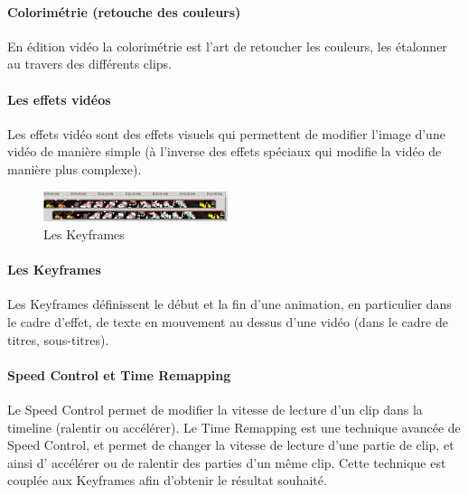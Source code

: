 \paragraph{Colorimétrie (retouche des couleurs)}

En édition vidéo la colorimétrie est l'art de retoucher les couleurs,
les étalonner au travers des différents clips.

\paragraph{Les effets vidéos}

Les effets vidéo sont des effets visuels qui permettent de modifier
l'image d'une vidéo de manière simple (à l'inverse des effets spéciaux
qui modifie la vidéo de manière plus complexe).

\begin{figure}

   \vspace{-20pt}

    \begin{center}

      \includegraphics[width=0.48\textwidth]{images/keyframecurves}

    \end{center}

   \vspace{-30pt} \caption{Les Keyframes} \vspace{-10pt} \label{Yes}

\end{figure}

\paragraph{Les Keyframes}

Les Keyframes définissent le début et la fin d'une animation, en
particulier dans le cadre d'effet, de texte en mouvement au dessus d'une
vidéo (dans le cadre de titres, sous-titres).

\paragraph{Speed Control et Time Remapping}

Le Speed Control permet de modifier la vitesse de lecture d'un clip
dans la timeline (ralentir ou accélérer). Le Time Remapping est une
technique avancée de Speed Control, et permet de changer la vitesse de
lecture d'une partie de clip, et ainsi d' accélérer ou de ralentir des
parties d'un même clip. Cette technique est couplée aux Keyframes afin
d'obtenir le résultat souhaité.


